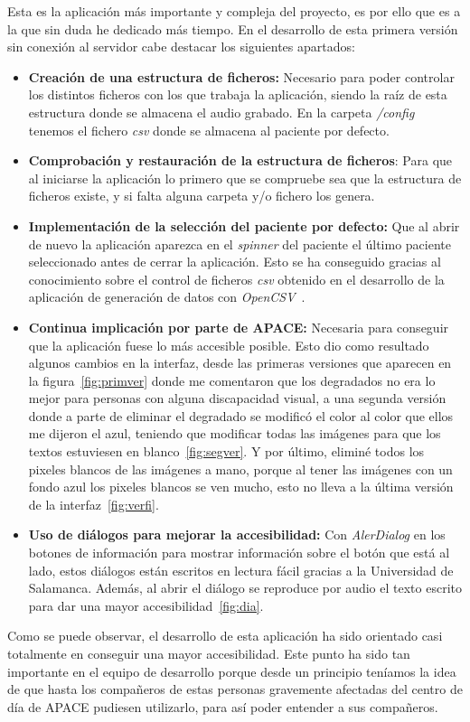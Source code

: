 Esta es la aplicación más importante y compleja del proyecto, es por ello que es a la que sin duda he dedicado más tiempo. En el desarrollo de esta primera versión sin conexión al servidor cabe destacar los siguientes apartados:
\begin{itemize}
	\item \textbf{Creación de una estructura de ficheros:} Necesario para poder controlar los distintos ficheros con los que trabaja la aplicación, siendo la raíz de esta estructura donde se almacena el audio grabado. En la carpeta \textit{/config} tenemos el fichero \textit{csv} donde se almacena al paciente por defecto.
	\item \textbf{Comprobación y restauración de la estructura de ficheros}: Para que al iniciarse la aplicación lo primero que se compruebe sea que la estructura de ficheros existe, y si falta alguna carpeta y/o fichero los genera.
	\item \textbf{Implementación de la selección del paciente por defecto:} Que al abrir de nuevo la aplicación aparezca en el \textit{spinner} del paciente el último paciente seleccionado antes de cerrar la aplicación. Esto se ha conseguido gracias al conocimiento sobre el control de ficheros \textit{csv} obtenido en el desarrollo de la aplicación de generación de datos con \textit{OpenCSV}~\cite{opencsv}.
	\item \textbf{Continua implicación por parte de APACE:} Necesaria para conseguir que la aplicación fuese lo más accesible posible. Esto dio como resultado algunos cambios en la interfaz, desde las primeras versiones que aparecen en la figura~\ref{fig:primver} donde me comentaron que los degradados no era lo mejor para personas con alguna discapacidad visual, a una segunda versión donde a parte de eliminar el degradado se modificó el color al color que ellos me dijeron el azul, teniendo que modificar todas las imágenes para que los textos estuviesen en blanco~\ref{fig:segver}. Y por último, eliminé todos los pixeles blancos de las imágenes a mano, porque al tener las imágenes con un fondo azul los pixeles blancos se ven mucho, esto no lleva a la última versión de la interfaz~\ref{fig:verfi}.
	\item \textbf{Uso de diálogos para mejorar la accesibilidad:} Con \textit{AlerDialog} en los botones de información para mostrar información sobre el botón que está al lado, estos diálogos están escritos en lectura fácil gracias a la Universidad de Salamanca. Además, al abrir el diálogo se reproduce por audio el texto escrito para dar una mayor accesibilidad~\ref{fig:dia}.
\end{itemize}
Como se puede observar, el desarrollo de esta aplicación ha sido orientado casi totalmente en conseguir una mayor accesibilidad. Este punto ha sido tan importante en el equipo de desarrollo porque desde un principio teníamos la idea de que hasta los compañeros de estas personas gravemente afectadas del centro de día de APACE pudiesen utilizarlo, para así poder entender a sus compañeros.

